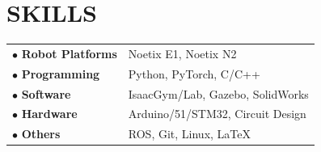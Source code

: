 \documentclass[a4paper,11pt]{article}
\begin{document}
\section{SKILLS}
\begin{tabularx}{\linewidth}{@{}l X@{}}
$\bullet$ \textbf{Robot Platforms} & Noetix E1, Noetix N2 \\[3.75pt]
$\bullet$ \textbf{Programming} & Python, PyTorch, C/C++ \\[3.75pt]
$\bullet$ \textbf{Software} & IsaacGym/Lab, Gazebo, SolidWorks \\[3.75pt]
$\bullet$ \textbf{Hardware} & Arduino/51/STM32, Circuit Design \\[3.75pt]
$\bullet$ \textbf{Others} & ROS, Git, Linux, LaTeX \\
\end{tabularx}

\thispagestyle{lastfoot}
\end{document}
